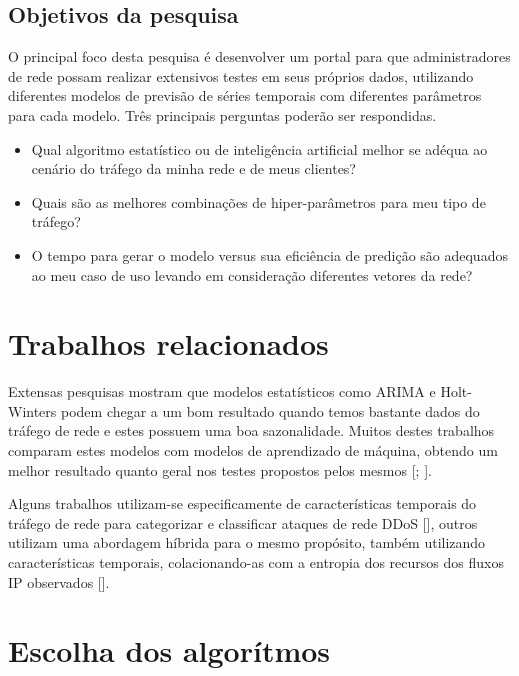 \documentclass[12pt]{article}
\begin{document}
\subsection{Objetivos da pesquisa}

O principal foco desta pesquisa é desenvolver um portal para que administradores de rede possam realizar extensivos testes em seus próprios dados, utilizando diferentes modelos de previsão de séries temporais com diferentes parâmetros para cada modelo. Três principais perguntas poderão ser respondidas.

\begin{itemize}
  \item Qual algoritmo estatístico ou de inteligência artificial melhor se adéqua ao cenário do tráfego da minha rede e de meus clientes?
  \item Quais são as melhores combinações de hiper-parâmetros para meu tipo de tráfego?
  \item O tempo para gerar o modelo versus sua eficiência de predição são adequados ao meu caso de uso levando em consideração diferentes vetores da rede?
\end{itemize}

\section{Trabalhos relacionados} \label{sec:relatedword}

Extensas pesquisas mostram que modelos estatísticos como ARIMA e Holt-Winters podem chegar a um bom resultado quando temos bastante dados do tráfego de rede e estes possuem uma boa sazonalidade. Muitos destes trabalhos comparam estes modelos com modelos de aprendizado de máquina, obtendo um melhor resultado quanto geral nos testes propostos pelos mesmos [\cite{krishnaswamy_data-driven_2020}; \cite{madan_predicting_2018}]. 

Alguns trabalhos utilizam-se especificamente de características temporais do tráfego de rede para categorizar e classificar ataques de rede DDoS [\cite{halladay_detection_2022}], outros utilizam uma abordagem híbrida para o mesmo propósito, também utilizando características temporais, colacionando-as com a entropia dos recursos dos fluxos IP observados [\cite{ding_tracking_2022}].

\section{Escolha dos algorítmos}
\end{document}
